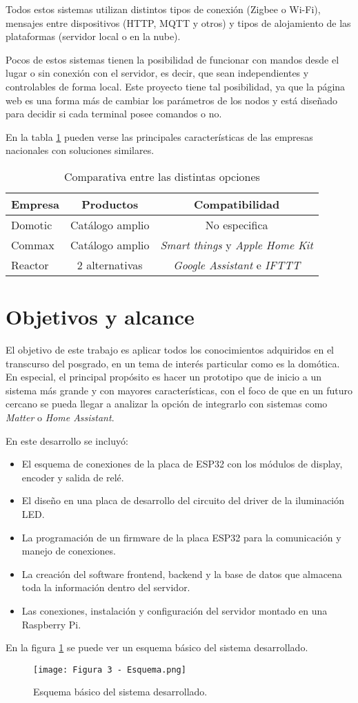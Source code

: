 Todos estos sistemas utilizan distintos tipos de conexión (Zigbee o Wi-Fi), mensajes entre dispositivos (HTTP, MQTT y otros) y tipos de alojamiento de las plataformas (servidor local o en la nube).

Pocos de estos sistemas tienen la posibilidad de funcionar con mandos desde el lugar o sin conexión con el servidor, es decir, que sean independientes y controlables de forma local. Este proyecto tiene tal posibilidad, ya que la página web es una forma más de cambiar los parámetros de los nodos y está diseñado para decidir si cada terminal posee comandos o no.

En la tabla \ref{tab:empresas} pueden verse las principales características de las empresas nacionales con soluciones similares.

\begin{table}[h]
\centering
\caption[Mercado nacional]{Comparativa entre las distintas opciones}
\begin{tabular}{l c c}
\toprule
\textbf{Empresa} & \textbf{Productos} & \textbf{Compatibilidad}\\
\midrule
Domotic	& Catálogo amplio & No especifica \\
Commax	& Catálogo amplio & \textit{Smart things} y \textit{Apple Home Kit}	\\
Reactor	& 2 alternativas & \textit{Google Assistant} e \textit{IFTTT} \\
\bottomrule
\hline
\end{tabular}
\label{tab:empresas}
\end{table}

\section{Objetivos y alcance}

El objetivo de este trabajo es aplicar todos los conocimientos adquiridos en el transcurso del posgrado, en un tema de interés particular como es la domótica. En especial, el principal propósito es hacer un prototipo que de inicio a un sistema más grande y con mayores características, con el foco de que en un futuro cercano se pueda llegar a analizar la opción de integrarlo con sistemas como \textit{Matter} o \textit{Home Assistant}.

En este desarrollo se incluyó:
\begin{itemize}
	\item El esquema de conexiones de la placa de ESP32 con los módulos de display, encoder y salida de relé.
	\item El diseño en una placa de desarrollo del circuito del driver de la iluminación LED.
	\item La programación de un firmware de la placa ESP32 para la comunicación y manejo de conexiones.
	\item La creación del software frontend, backend y la base de datos que almacena toda la información dentro del servidor.
	\item Las conexiones, instalación y configuración del servidor montado en una Raspberry Pi.
\end{itemize}

En la figura \ref{fig:4} se puede ver un esquema básico del sistema desarrollado.
\begin{figure}[h]
\centering
\texttt{[image: Figura 3 - Esquema.png]}
\caption[Esquema básico]{Esquema básico del sistema desarrollado. \protect}
\label{fig:4}
\end{figure}